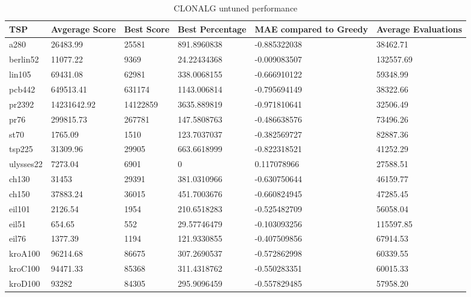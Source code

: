 \begin{table}[H]
	\begin{tabular}{|l|l|l|p{2cm}|p{2.5cm}|p{2cm}|}
		\hline
	TSP	& Avgerage Score & Best Score & Best Percentage & MAE compared to Greedy & Average Evaluations \\ \hline
		a280      & 26483.99       & 25581      & 891.8960838     & -0.885322038           & 38462.71            \\ \hline
		berlin52  & 11077.22       & 9369       & 24.22434368     & -0.009083507           & 132557.69           \\ \hline
		lin105    & 69431.08       & 62981      & 338.0068155     & -0.666910122           & 59348.99            \\ \hline
		pcb442    & 649513.41      & 631174     & 1143.006814     & -0.795694149           & 38322.66            \\ \hline
		pr2392    & 14231642.92    & 14122859   & 3635.889819     & -0.971810641           & 32506.49            \\ \hline
		pr76      & 299815.73      & 267781     & 147.5808763     & -0.486638576           & 73496.26            \\ \hline
		st70      & 1765.09        & 1510       & 123.7037037     & -0.382569727           & 82887.36            \\ \hline
		tsp225    & 31309.96       & 29905      & 663.6618999     & -0.822318521           & 41252.29            \\ \hline
		ulysses22 & 7273.04        & 6901       & 0               & 0.117078966            & 27588.51            \\ \hline
		ch130     & 31453          & 29391      & 381.0310966     & -0.630750644           & 46159.77            \\ \hline
		ch150     & 37883.24       & 36015      & 451.7003676     & -0.660824945           & 47285.45            \\ \hline
		eil101    & 2126.54        & 1954       & 210.6518283     & -0.525482709           & 56058.04            \\ \hline
		eil51     & 654.65         & 552        & 29.57746479     & -0.103093256           & 115597.85           \\ \hline
		eil76     & 1377.39        & 1194       & 121.9330855     & -0.407509856           & 67914.53            \\ \hline
		kroA100   & 96214.68       & 86675      & 307.2690537     & -0.572862998           & 60339.55            \\ \hline
		kroC100   & 94471.33       & 85368      & 311.4318762     & -0.550283351           & 60015.33            \\ \hline
		kroD100   & 93282          & 84305      & 295.9096459     & -0.557829485           & 57958.20            \\ \hline
	\end{tabular}
	\caption{CLONALG untuned performance}
	\label{tab:clonalg_untuned}
\end{table}
